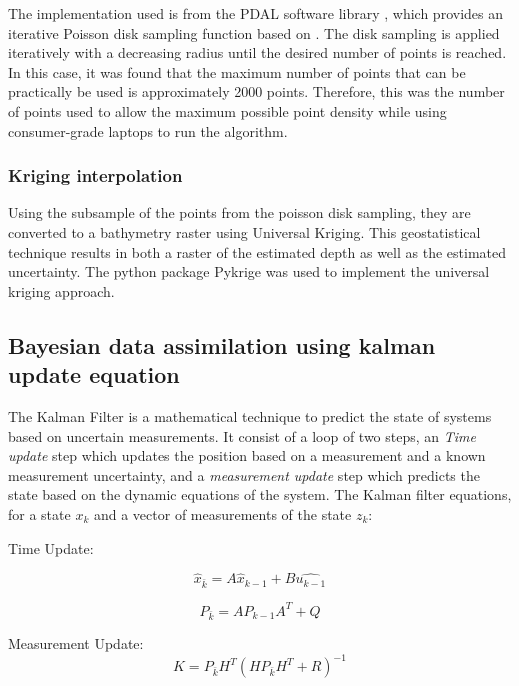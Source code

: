 The implementation used is from the PDAL software library \parencite{howard_butler_2022_6369164}, which provides an iterative Poisson disk sampling function based on \citeauthor{McCool1992}. The disk sampling is applied iteratively with a decreasing radius until the desired number of points is reached. In this case, it was found that the maximum number of points that can be practically be used is approximately 2000 points. Therefore, this was the number of points used to allow the maximum possible point density while using consumer-grade laptops to run the algorithm. 

\subsubsection{Kriging interpolation}
Using the subsample of the points from the poisson disk sampling, they are converted to a bathymetry raster using Universal Kriging. This geostatistical technique results in both a raster of the estimated depth as well as the estimated uncertainty. The python package Pykrige \parencite{benjamin_murphy_2021_5380342} was used to implement the universal kriging approach.


\subsection{Bayesian data assimilation using kalman update equation}
The Kalman Filter is a mathematical technique to predict the state of systems based on uncertain measurements. It consist of a loop of two steps, an \emph{Time update} step which updates the position based on a measurement and a known measurement uncertainty, and a \emph{measurement update} step which predicts the state based on the dynamic equations of the system. The Kalman filter equations, for a state $x_k$ and a vector of measurements of the state $z_k$:

Time Update:

\begin{equation}
    \hat{x}_{\bar{k}} = A\hat{x}_{k-1} + B\hat{u_{k-1}}
\end{equation}

\begin{equation}
    P_{\bar{k}} = A P_{k-1} A^T + Q
\end{equation}

Measurement Update:
\begin{equation}
    K = P_{\bar{k}} H^T(H P_{\bar{k}} H^T + R) ^{-1}
\end{equation}

